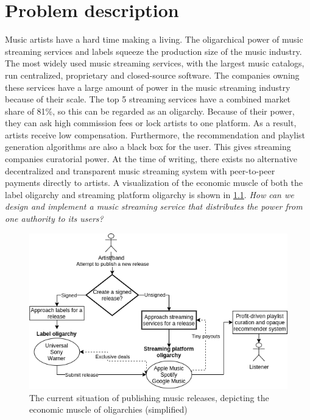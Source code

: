 \chapter{\label{chap:related-work}Problem description}
Music artists have a hard time making a living. The oligarchical power of music streaming services and labels squeeze the production size of the music industry. The most widely used music streaming services, with the largest music catalogs, run centralized, proprietary and closed-source software. The companies owning these services have a large amount of power in the music streaming industry because of their scale. The top 5 streaming services have a combined market share of 81\%, so this can be regarded as an oligarchy. Because of their power, they can ask high commission fees or lock artists to one platform. As a result, artists receive low compensation. Furthermore, the recommendation and playlist generation algorithms are also a black box for the user. This gives streaming companies curatorial power. At the time of writing, there exists no alternative decentralized and transparent music streaming system with peer-to-peer payments directly to artists. A visualization of the economic muscle of both the label oligarchy and streaming platform oligarchy is shown in \ref{fig:current-music-publishing-situation}.
\textit{How can we design and implement a music streaming service that distributes the power from one authority to its users?}%
\begin{figure}
    \centering
    \includegraphics[width=0.8\linewidth]{problem-description/current-music-publishing-situation.png}
    \caption{The current situation of publishing music releases, depicting the economic muscle of oligarchies (simplified)}
    \label{fig:current-music-publishing-situation}
\end{figure}

